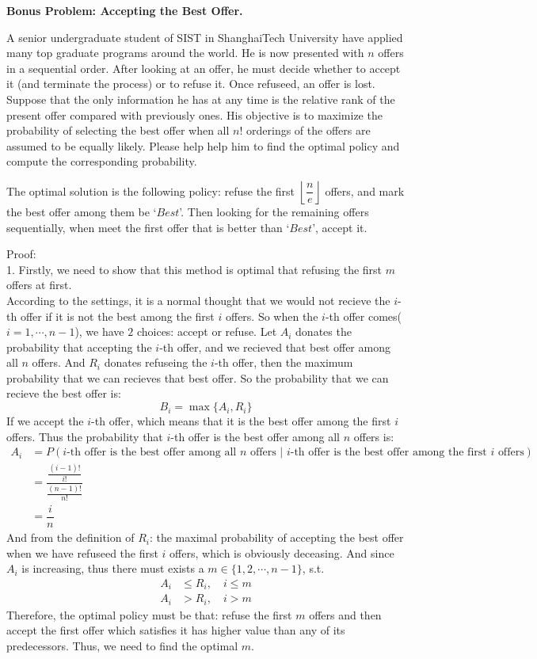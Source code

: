 \begin{homeworkProblem}

\textbf{Bonus Problem: Accepting the Best Offer.}

A senior undergraduate student of SIST in ShanghaiTech University have applied many top graduate programs around the world. He is now presented with $n$ offers in a sequential order. After looking at an offer, he must decide whether to accept it (and terminate the process) or to refuse it. Once refuseed, an offer is lost. Suppose that the only information he has at any time is the relative rank of the present offer compared with previously ones. His objective is to maximize the probability of selecting the best offer when all $n!$ orderings of the offers are assumed to be equally likely. Please help help him to find the optimal policy and compute the corresponding probability.

\solution

The optimal solution is the following policy: refuse the first $\left\lfloor \dfrac{n}{e} \right\rfloor$ offers, and mark the best offer among them be `$Best$'. Then looking for the remaining offers sequentially, when meet the first offer that is better than `$Best$', accept it.

Proof: \\
1. Firstly, we need to show that this method is optimal that refusing the first $m$ offers at first. \\
According to the settings, it is a normal thought that we would not recieve the $i$-th offer if it is not the best among the first $i$ offers. So when the $i$-th offer comes($i=1,\cdots,n-1$), we have $2$ choices: accept or refuse. Let $A_i$ donates the probability that accepting the $i$-th offer, and we recieved that best offer among all $n$ offers. And $R_i$ donates refuseing the $i$-th offer, then the maximum probability that we can recieves that best offer. So the probability that we can recieve the best offer is:
$$B_i = \max\{A_i, R_i\}$$
If we accept the $i$-th offer, which means that it is the best offer among the first $i$ offers. Thus the probability that $i$-th offer is the best offer among all $n$ offers is:
\begin{align*}
A_i &= P(\text{$i$-th offer is the best offer among all $n$ offers | $i$-th offer is the best offer among the first $i$ offers}) \\
&= \dfrac{\frac{(i-1)!}{i!}}{\frac{(n-1)!}{n!}} \\
&= \dfrac{i}{n}
\end{align*}
And from the definition of $R_i$: the maximal probability of accepting the best offer when we have refuseed the first $i$ offers, which is obviously deceasing. And since $A_i$ is increasing, thus there must exists a $m\in\{1,2,\cdots,n-1\}$, s.t.
\begin{align*}
A_i &\leq R_i, \quad i \leq m \\
A_i &> R_i,\quad i > m
\end{align*}
Therefore, the optimal policy must be that: refuse the first $m$ offers and then accept the first offer which satisfies it has higher value than any of its predecessors. Thus, we need to find the optimal $m$.


\end{homeworkProblem}
